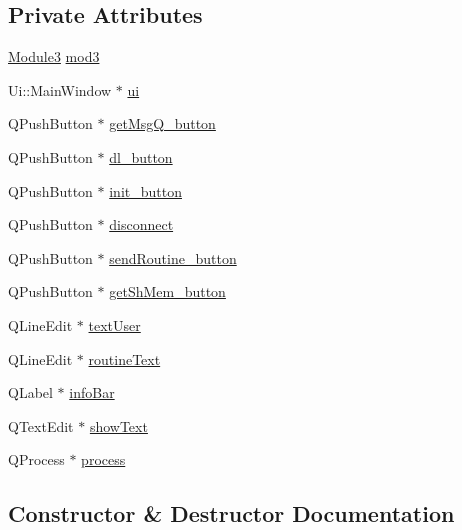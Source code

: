\subsection*{Private Attributes}
\begin{DoxyCompactItemize}
\item 
\mbox{\hyperlink{class_module3}{Module3}} \mbox{\hyperlink{class_main_window_a13d73f676f1bfdd6090677bbc17dc3bb}{mod3}}
\item 
Ui\+::\+Main\+Window $\ast$ \mbox{\hyperlink{class_main_window_a35466a70ed47252a0191168126a352a5}{ui}}
\item 
Q\+Push\+Button $\ast$ \mbox{\hyperlink{class_main_window_a33fff3efd2a06d6df2e37219d44d9d20}{get\+Msg\+Q\+\_\+button}}
\item 
Q\+Push\+Button $\ast$ \mbox{\hyperlink{class_main_window_afb9e7419ea1c7c1f109857ac8ed9e703}{dl\+\_\+button}}
\item 
Q\+Push\+Button $\ast$ \mbox{\hyperlink{class_main_window_ad1cf02a751bb3647114db947acebcaf5}{init\+\_\+button}}
\item 
Q\+Push\+Button $\ast$ \mbox{\hyperlink{class_main_window_a9d4a6f9ce2275a736abcedf0bba2bad9}{disconnect}}
\item 
Q\+Push\+Button $\ast$ \mbox{\hyperlink{class_main_window_a56a195b11e21a9e73cc7adad5b4666a1}{send\+Routine\+\_\+button}}
\item 
Q\+Push\+Button $\ast$ \mbox{\hyperlink{class_main_window_a26663544e9c5a627b73df4d060a9a06a}{get\+Sh\+Mem\+\_\+button}}
\item 
Q\+Line\+Edit $\ast$ \mbox{\hyperlink{class_main_window_a98c79855a722db4582f2c1f41b0369df}{text\+User}}
\item 
Q\+Line\+Edit $\ast$ \mbox{\hyperlink{class_main_window_ab016004d1d7ba0084b7201072c2ff193}{routine\+Text}}
\item 
Q\+Label $\ast$ \mbox{\hyperlink{class_main_window_ad1f2bbeefb0b2f010eef8fcd2f0b825f}{info\+Bar}}
\item 
Q\+Text\+Edit $\ast$ \mbox{\hyperlink{class_main_window_ae1fe4774da9daef3570ef190df36773e}{show\+Text}}
\item 
Q\+Process $\ast$ \mbox{\hyperlink{class_main_window_a9f6d60a6052813c8d83a0a2b3e1c9b2a}{process}}
\end{DoxyCompactItemize}


\subsection{Constructor \& Destructor Documentation}
\mbox{\label{class_main_window_a8b244be8b7b7db1b08de2a2acb9409db}} 

